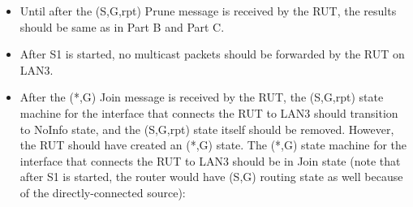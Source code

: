 \documentclass[11pt]{report}
\begin{document}
\begin{itemize}

  \item Until after the (S,G,rpt) Prune message is received by the RUT, the
  results should be same as in Part B and Part C.

  \item After S1 is started, no multicast packets should be
  forwarded by the RUT on LAN3.

  \item After the (*,G) Join message is received by the RUT,
  the (S,G,rpt) state machine for the interface that connects the RUT to
  LAN3 should transition to NoInfo state, and the (S,G,rpt) state itself
  should be removed. However, the RUT should have created an (*,G) state.
  The (*,G) state machine for the interface that connects the RUT to
  LAN3 should be in Join state (note that after S1 is started, the router
  would have (S,G) routing state as well because of the directly-connected
  source):


\end{itemize}
\end{document}
